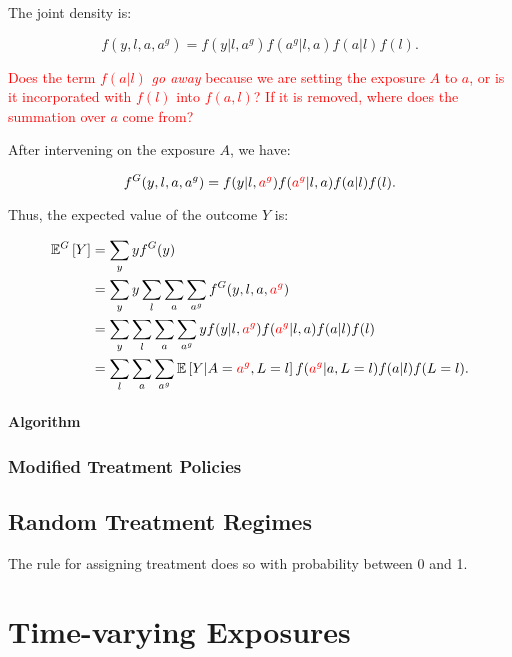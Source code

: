 \documentclass[12pt]{article}
\begin{document}
The joint density is:

\begin{equation}
    f(y,l,a,a^g) = f(y|l,a^g) f(a^g|l,a) f(a|l) f(l).
\end{equation}

\textcolor{red}{Does the term $f(a|l)$ \textit{go away} because we are setting the exposure $A$ to $a$, or is it incorporated with $f(l)$ into $f(a,l)$? If it is removed, where does the summation over $a$ come from?}

After intervening on the exposure $A$, we have:

\begin{equation}
    f^G(y,l,a,a^g) = f(y|l,\textcolor{red}{a^g}) f(\textcolor{red}{a^g}|l,a) f(a|l) f(l).
\end{equation}

Thus, the expected value of the outcome $Y$ is:

\begin{align}
    \mathbb{E}^G \left[ Y \right] &= \sum_y y f^G(y) \\
    &= \sum_y y \sum_l \sum_a \sum_{a^g} f^G(y,l,a,\textcolor{red}{a^g}) \\
    &= \sum_y \sum_l \sum_a \sum_{a^g} y f(y|l,\textcolor{red}{a^g}) f(\textcolor{red}{a^g}|l,a) f(a|l) f(l) \\
    &= \sum_l \sum_a \sum_{a^g} \mathbb{E} \left[ Y|A=\textcolor{red}{a^g},L=l\right] f(\textcolor{red}{a^g}|a,L=l) f(a|l) f(L=l).
\end{align}

\paragraph{Algorithm}

\subsubsection*{Modified Treatment Policies}

\subsection{Random Treatment Regimes}
The rule for assigning treatment does so with probability between 0 and 1.

\section{Time-varying Exposures}
\end{document}
